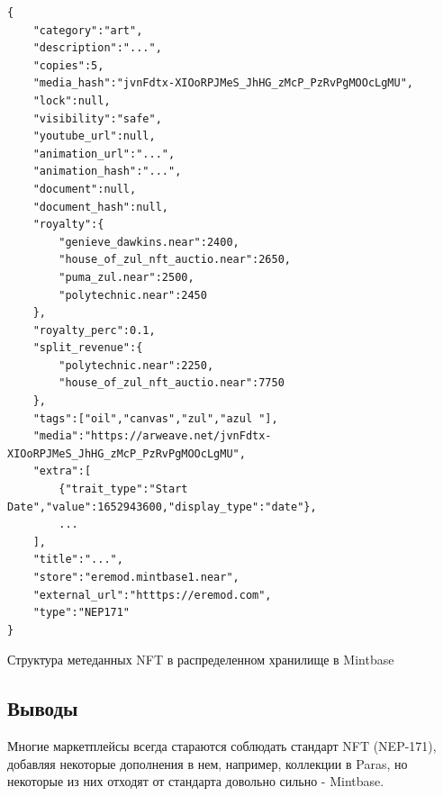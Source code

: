 \begin{listing}
\begin{verbatim}
{
    "category":"art",
    "description":"...",
    "copies":5,
    "media_hash":"jvnFdtx-XIOoRPJMeS_JhHG_zMcP_PzRvPgMOOcLgMU",
    "lock":null,
    "visibility":"safe",
    "youtube_url":null,
    "animation_url":"...",
    "animation_hash":"...",
    "document":null,
    "document_hash":null,
    "royalty":{
        "genieve_dawkins.near":2400,
        "house_of_zul_nft_auctio.near":2650,
        "puma_zul.near":2500,
        "polytechnic.near":2450
    },
    "royalty_perc":0.1,
    "split_revenue":{
        "polytechnic.near":2250,
        "house_of_zul_nft_auctio.near":7750
    },
    "tags":["oil","canvas","zul","azul "],
    "media":"https://arweave.net/jvnFdtx-XIOoRPJMeS_JhHG_zMcP_PzRvPgMOOcLgMU",
    "extra":[
        {"trait_type":"Start Date","value":1652943600,"display_type":"date"},
        ...
    ],
    "title":"...",
    "store":"eremod.mintbase1.near",
    "external_url":"htttps://eremod.com",
    "type":"NEP171"
}

\end{verbatim}
\caption{Структура метеданных NFT в распределенном хранилище в Mintbase}
\label{lst.mintbase.nftstructmeta}
\end{listing}

\subsection{Выводы}
Многие маркетплейсы всегда стараются соблюдать стандарт NFT (NEP-171), добавляя некоторые дополнения в нем, например, коллекции в  Paras, но некоторые из них отходят от стандарта довольно сильно - Mintbase. 
